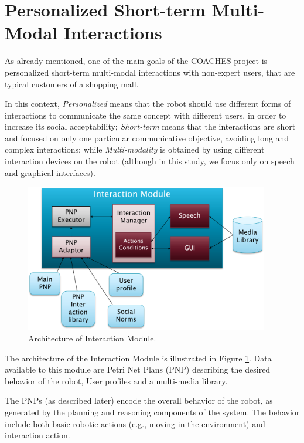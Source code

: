 \section{Personalized Short-term Multi-Modal Interactions}

As already mentioned, 
one of the main goals of the COACHES project is personalized short-term multi-modal interactions with non-expert users, that are typical customers of a shopping mall.

In this context, \emph{Personalized} means that the robot should use different forms of interactions to communicate the same concept with different users, in order to increase its social acceptability;
\emph{Short-term} means that the interactions are short and focused on only one particular communicative objective, avoiding long and complex interactions; while
\emph{Multi-modality} is obtained by using different interaction devices on the robot (although in this study, we focus only on speech and graphical interfaces).



\begin{figure}
\centering
\includegraphics[width=0.95\textwidth]{fig/WP3.png}
\caption{Architecture of Interaction Module.}
\label{fig:WP3}
\end{figure}

The architecture of the Interaction Module is illustrated in Figure \ref{fig:WP3}. Data available to this module are Petri Net Plans (PNP) describing the desired behavior of the robot, User profiles and a multi-media library.

The PNPs (as described later) encode the overall behavior of the robot, as generated by the planning and reasoning components of the system. The behavior include both basic robotic actions (e.g., moving in the environment) and interaction action.

